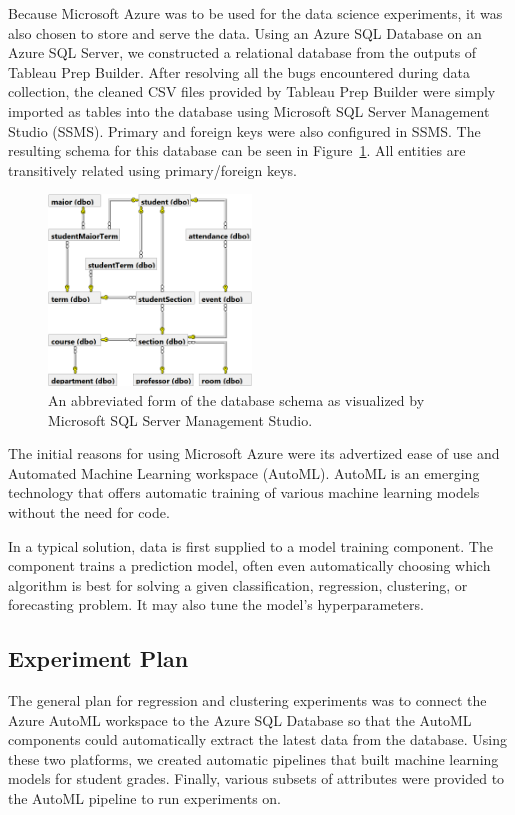 Because Microsoft Azure was to be used for the data science experiments, it was also chosen to store and serve the data. Using an Azure SQL Database on an Azure SQL Server, we constructed a relational database from the outputs of Tableau Prep Builder. After resolving all the bugs encountered during data collection, the cleaned CSV files provided by Tableau Prep Builder were simply imported as tables into the database using Microsoft SQL Server Management Studio (SSMS). Primary and foreign keys were also configured in SSMS. The resulting schema for this database can be seen in Figure~\ref{fig:schema}. All entities are transitively related using primary/foreign keys.

\begin{figure}[ht]
  \centering
  \includegraphics[width=0.48\textwidth]{figures/attendanceDBSchema.png}
  \caption{An abbreviated form of the database schema as visualized by Microsoft SQL Server Management Studio.}
  \label{fig:schema}
\end{figure}

The initial reasons for using Microsoft Azure were its advertized ease of use and Automated Machine Learning workspace (AutoML). AutoML is an emerging technology that offers automatic training of various machine learning models without the need for code.

In a typical solution, data is first supplied to a model training component. The component trains a prediction model, often even automatically choosing which algorithm is best for solving a given classification, regression, clustering, or forecasting problem. It may also tune the model's hyperparameters.

\subsection{Experiment Plan}
The general plan for regression and clustering experiments was to connect the Azure AutoML workspace to the Azure SQL Database so that the AutoML components could automatically extract the latest data from the database. Using these two platforms, we created automatic pipelines that built machine learning models for student grades. Finally, various subsets of attributes were provided to the AutoML pipeline to run experiments on.

